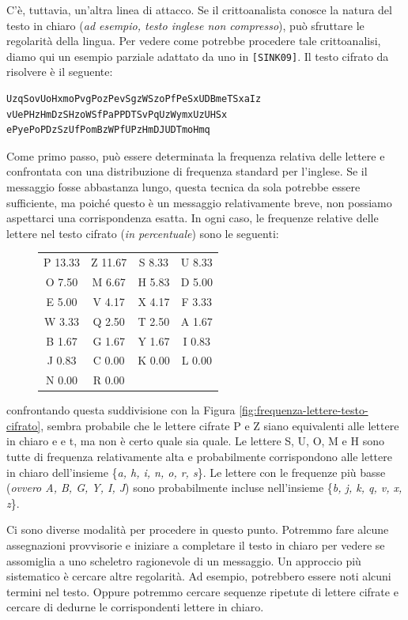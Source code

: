 C'è, tuttavia, un'altra linea di attacco. Se il crittoanalista
conosce la natura del testo in chiaro (\textit{ad esempio, testo inglese
non compresso}), può sfruttare le regolarità della lingua. Per vedere
come potrebbe procedere tale crittoanalisi, diamo qui un esempio
parziale adattato da uno in \verb|[SINK09]|. Il testo cifrato da
risolvere
è il seguente:
\begin{verbatim}
UzqSovUoHxmoPvgPozPevSgzWSzoPfPeSxUDBmeTSxaIz
vUePHzHmDzSHzoWSfPaPPDTSvPqUzWymxUzUHSx
ePyePoPDzSzUfPomBzWPfUPzHmDJUDTmoHmq
\end{verbatim}
Come primo passo, può essere determinata la frequenza relativa delle
lettere e confrontata con una distribuzione di frequenza standard per
l'inglese.
Se il messaggio fosse abbastanza lungo, questa tecnica da sola potrebbe
essere sufficiente, ma poiché questo è un messaggio relativamente breve,
non possiamo aspettarci una corrispondenza esatta. In ogni caso, le
frequenze relative delle lettere nel testo cifrato (\textit{in percentuale}) sono
le seguenti:
\begin{figure}[H]
    \centering
    \begin{tabular}{cccc}
        P 13.33 & Z 11.67 & S 8.33 & U 8.33 \\
        O 7.50 & M 6.67 & H 5.83 & D 5.00 \\
        E 5.00 & V 4.17 & X 4.17 & F 3.33 \\
        W 3.33 & Q 2.50 & T 2.50 & A 1.67 \\
        B 1.67 & G 1.67 & Y 1.67 & I 0.83 \\
        J 0.83 & C 0.00 & K 0.00 & L 0.00 \\
        N 0.00 & R 0.00 &
    \end{tabular}
\end{figure}
confrontando questa suddivisione con la Figura \ref{fig:frequenza-lettere-testo-cifrato}, sembra probabile
che le lettere cifrate P e Z siano equivalenti alle lettere in chiaro e e t, ma non è certo quale sia
quale. Le lettere S, U, O, M e H sono tutte di frequenza relativamente alta e probabilmente corrispondono
alle lettere in chiaro dell'insieme \{\textit{a, h, i, n, o, r, s}\}. Le lettere con le frequenze più basse
(\textit{ovvero A, B, G, Y, I, J}) sono probabilmente incluse nell'insieme \{\textit{b, j, k, q, v, x, z}\}.

Ci sono diverse modalità per procedere in questo punto. Potremmo fare alcune assegnazioni
provvisorie e iniziare a completare il testo in chiaro per vedere se assomiglia a uno scheletro
ragionevole di un messaggio. Un approccio più sistematico è cercare altre regolarità. Ad esempio,
potrebbero essere noti alcuni termini nel testo. Oppure potremmo cercare sequenze ripetute di lettere
cifrate e cercare di dedurne le corrispondenti lettere in chiaro.

